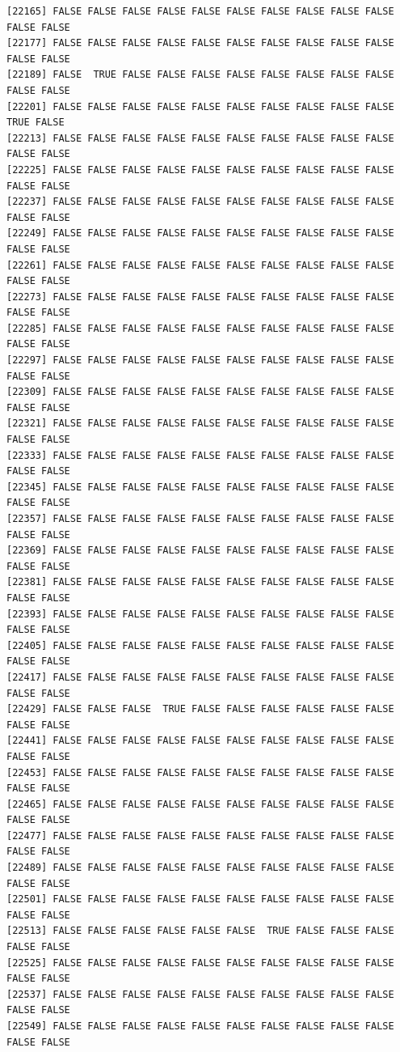 \documentclass[
  a4paper,
  DIV=11,
  numbers=noendperiod]{scrartcl}
\begin{document}
\begin{verbatim}
[22165] FALSE FALSE FALSE FALSE FALSE FALSE FALSE FALSE FALSE FALSE FALSE FALSE
[22177] FALSE FALSE FALSE FALSE FALSE FALSE FALSE FALSE FALSE FALSE FALSE FALSE
[22189] FALSE  TRUE FALSE FALSE FALSE FALSE FALSE FALSE FALSE FALSE FALSE FALSE
[22201] FALSE FALSE FALSE FALSE FALSE FALSE FALSE FALSE FALSE FALSE  TRUE FALSE
[22213] FALSE FALSE FALSE FALSE FALSE FALSE FALSE FALSE FALSE FALSE FALSE FALSE
[22225] FALSE FALSE FALSE FALSE FALSE FALSE FALSE FALSE FALSE FALSE FALSE FALSE
[22237] FALSE FALSE FALSE FALSE FALSE FALSE FALSE FALSE FALSE FALSE FALSE FALSE
[22249] FALSE FALSE FALSE FALSE FALSE FALSE FALSE FALSE FALSE FALSE FALSE FALSE
[22261] FALSE FALSE FALSE FALSE FALSE FALSE FALSE FALSE FALSE FALSE FALSE FALSE
[22273] FALSE FALSE FALSE FALSE FALSE FALSE FALSE FALSE FALSE FALSE FALSE FALSE
[22285] FALSE FALSE FALSE FALSE FALSE FALSE FALSE FALSE FALSE FALSE FALSE FALSE
[22297] FALSE FALSE FALSE FALSE FALSE FALSE FALSE FALSE FALSE FALSE FALSE FALSE
[22309] FALSE FALSE FALSE FALSE FALSE FALSE FALSE FALSE FALSE FALSE FALSE FALSE
[22321] FALSE FALSE FALSE FALSE FALSE FALSE FALSE FALSE FALSE FALSE FALSE FALSE
[22333] FALSE FALSE FALSE FALSE FALSE FALSE FALSE FALSE FALSE FALSE FALSE FALSE
[22345] FALSE FALSE FALSE FALSE FALSE FALSE FALSE FALSE FALSE FALSE FALSE FALSE
[22357] FALSE FALSE FALSE FALSE FALSE FALSE FALSE FALSE FALSE FALSE FALSE FALSE
[22369] FALSE FALSE FALSE FALSE FALSE FALSE FALSE FALSE FALSE FALSE FALSE FALSE
[22381] FALSE FALSE FALSE FALSE FALSE FALSE FALSE FALSE FALSE FALSE FALSE FALSE
[22393] FALSE FALSE FALSE FALSE FALSE FALSE FALSE FALSE FALSE FALSE FALSE FALSE
[22405] FALSE FALSE FALSE FALSE FALSE FALSE FALSE FALSE FALSE FALSE FALSE FALSE
[22417] FALSE FALSE FALSE FALSE FALSE FALSE FALSE FALSE FALSE FALSE FALSE FALSE
[22429] FALSE FALSE FALSE  TRUE FALSE FALSE FALSE FALSE FALSE FALSE FALSE FALSE
[22441] FALSE FALSE FALSE FALSE FALSE FALSE FALSE FALSE FALSE FALSE FALSE FALSE
[22453] FALSE FALSE FALSE FALSE FALSE FALSE FALSE FALSE FALSE FALSE FALSE FALSE
[22465] FALSE FALSE FALSE FALSE FALSE FALSE FALSE FALSE FALSE FALSE FALSE FALSE
[22477] FALSE FALSE FALSE FALSE FALSE FALSE FALSE FALSE FALSE FALSE FALSE FALSE
[22489] FALSE FALSE FALSE FALSE FALSE FALSE FALSE FALSE FALSE FALSE FALSE FALSE
[22501] FALSE FALSE FALSE FALSE FALSE FALSE FALSE FALSE FALSE FALSE FALSE FALSE
[22513] FALSE FALSE FALSE FALSE FALSE FALSE  TRUE FALSE FALSE FALSE FALSE FALSE
[22525] FALSE FALSE FALSE FALSE FALSE FALSE FALSE FALSE FALSE FALSE FALSE FALSE
[22537] FALSE FALSE FALSE FALSE FALSE FALSE FALSE FALSE FALSE FALSE FALSE FALSE
[22549] FALSE FALSE FALSE FALSE FALSE FALSE FALSE FALSE FALSE FALSE FALSE FALSE

\end{verbatim}
\end{document}
